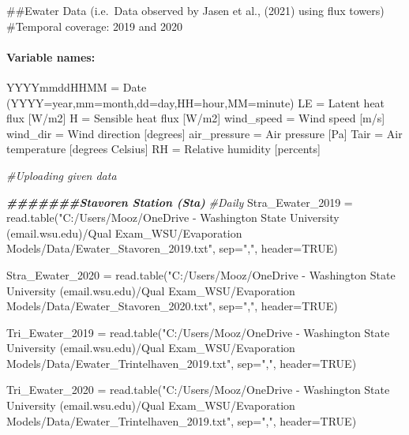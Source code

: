 \documentclass[
]{article}
\newenvironment{Shaded}{\begin{snugshade}}{\end{snugshade}}
\newcommand{\AttributeTok}[1]{\textcolor[rgb]{0.77,0.63,0.00}{#1}}
\newcommand{\CommentTok}[1]{\textcolor[rgb]{0.56,0.35,0.01}{\textit{#1}}}
\newcommand{\ConstantTok}[1]{\textcolor[rgb]{0.00,0.00,0.00}{#1}}
\newcommand{\DocumentationTok}[1]{\textcolor[rgb]{0.56,0.35,0.01}{\textbf{\textit{#1}}}}
\newcommand{\FunctionTok}[1]{\textcolor[rgb]{0.00,0.00,0.00}{#1}}
\newcommand{\NormalTok}[1]{#1}
\newcommand{\OtherTok}[1]{\textcolor[rgb]{0.56,0.35,0.01}{#1}}
\newcommand{\StringTok}[1]{\textcolor[rgb]{0.31,0.60,0.02}{#1}}
\begin{document}
\#\#Ewater Data (i.e.~Data observed by Jasen et al., (2021) using flux
towers) \#Temporal coverage: 2019 and 2020

\hypertarget{variable-names-1}{%
\paragraph{Variable names:}\label{variable-names-1}}

YYYYmmddHHMM = Date (YYYY=year,mm=month,dd=day,HH=hour,MM=minute) LE =
Latent heat flux {[}W/m2{]} H = Sensible heat flux {[}W/m2{]}
wind\_speed = Wind speed {[}m/s{]} wind\_dir = Wind direction
{[}degrees{]} air\_pressure = Air pressure {[}Pa{]} Tair = Air
temperature {[}degrees Celsius{]} RH = Relative humidity {[}percents{]}

\begin{Shaded}
\begin{Highlighting}[]
\CommentTok{\#Uploading given data}

\DocumentationTok{\#\#\#\#\#\#\#Stavoren Station (Sta)}
\CommentTok{\#Daily}
\NormalTok{Stra\_Ewater\_2019 }\OtherTok{=} \FunctionTok{read.table}\NormalTok{(}\StringTok{"C:/Users/Mooz/OneDrive {-} Washington State University (email.wsu.edu)/Qual Exam\_WSU/Evaporation Models/Data/Ewater\_Stavoren\_2019.txt"}\NormalTok{, }\AttributeTok{sep=}\StringTok{","}\NormalTok{, }\AttributeTok{header=}\ConstantTok{TRUE}\NormalTok{)}

\NormalTok{Stra\_Ewater\_2020 }\OtherTok{=} \FunctionTok{read.table}\NormalTok{(}\StringTok{"C:/Users/Mooz/OneDrive {-} Washington State University (email.wsu.edu)/Qual Exam\_WSU/Evaporation Models/Data/Ewater\_Stavoren\_2020.txt"}\NormalTok{, }\AttributeTok{sep=}\StringTok{","}\NormalTok{, }\AttributeTok{header=}\ConstantTok{TRUE}\NormalTok{)}
                              
\NormalTok{Tri\_Ewater\_2019 }\OtherTok{=} \FunctionTok{read.table}\NormalTok{(}\StringTok{"C:/Users/Mooz/OneDrive {-} Washington State University (email.wsu.edu)/Qual Exam\_WSU/Evaporation Models/Data/Ewater\_Trintelhaven\_2019.txt"}\NormalTok{, }\AttributeTok{sep=}\StringTok{","}\NormalTok{, }\AttributeTok{header=}\ConstantTok{TRUE}\NormalTok{)}

\NormalTok{Tri\_Ewater\_2020 }\OtherTok{=} \FunctionTok{read.table}\NormalTok{(}\StringTok{"C:/Users/Mooz/OneDrive {-} Washington State University (email.wsu.edu)/Qual Exam\_WSU/Evaporation Models/Data/Ewater\_Trintelhaven\_2019.txt"}\NormalTok{, }\AttributeTok{sep=}\StringTok{","}\NormalTok{, }\AttributeTok{header=}\ConstantTok{TRUE}\NormalTok{)                                                        }
\end{Highlighting}
\end{Shaded}
\end{document}

